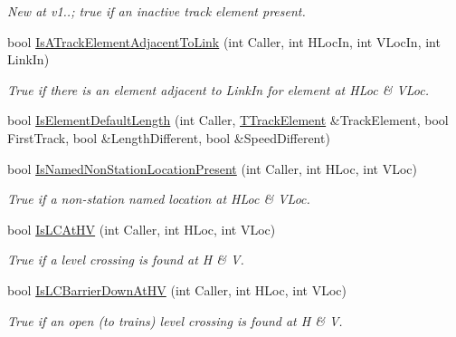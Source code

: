 \begin{DoxyCompactItemize}
\begin{DoxyCompactList}\small\item\em New at v1..; true if an inactive track element present. \end{DoxyCompactList}\item 
\mbox{\label{class_t_track_a5259f2d309f98df4f6e2821e7e71ca81}} 
bool \mbox{\hyperlink{class_t_track_a5259f2d309f98df4f6e2821e7e71ca81}{Is\+A\+Track\+Element\+Adjacent\+To\+Link}} (int Caller, int H\+Loc\+In, int V\+Loc\+In, int Link\+In)
\begin{DoxyCompactList}\small\item\em True if there is an element adjacent to Link\+In for element at H\+Loc \& V\+Loc. \end{DoxyCompactList}\item 
bool \mbox{\hyperlink{class_t_track_a9519d6fa40b71bfcad4d5383634d73dd}{Is\+Element\+Default\+Length}} (int Caller, \mbox{\hyperlink{class_t_track_element}{T\+Track\+Element}} \&Track\+Element, bool First\+Track, bool \&Length\+Different, bool \&Speed\+Different)
\item 
\mbox{\label{class_t_track_a7867a4b41fbc25f35eccab0b03cab9ed}} 
bool \mbox{\hyperlink{class_t_track_a7867a4b41fbc25f35eccab0b03cab9ed}{Is\+Named\+Non\+Station\+Location\+Present}} (int Caller, int H\+Loc, int V\+Loc)
\begin{DoxyCompactList}\small\item\em True if a non-\/station named location at H\+Loc \& V\+Loc. \end{DoxyCompactList}\item 
\mbox{\label{class_t_track_a73e781d0ada0b77618b886557f79b115}} 
bool \mbox{\hyperlink{class_t_track_a73e781d0ada0b77618b886557f79b115}{Is\+L\+C\+At\+HV}} (int Caller, int H\+Loc, int V\+Loc)
\begin{DoxyCompactList}\small\item\em True if a level crossing is found at H \& V. \end{DoxyCompactList}\item 
\mbox{\label{class_t_track_aad258b17c96ace0dbbad3754eb743274}} 
bool \mbox{\hyperlink{class_t_track_aad258b17c96ace0dbbad3754eb743274}{Is\+L\+C\+Barrier\+Down\+At\+HV}} (int Caller, int H\+Loc, int V\+Loc)
\begin{DoxyCompactList}\small\item\em True if an open (to trains) level crossing is found at H \& V. \end{DoxyCompactList}\item 

\end{DoxyCompactItemize}
